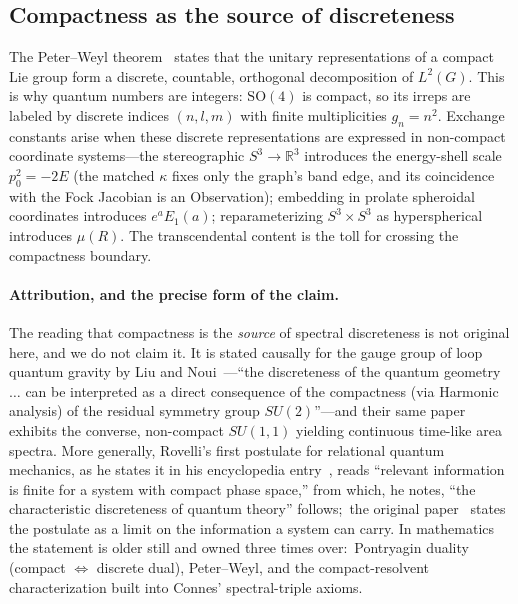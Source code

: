 \documentclass[aps,pra,twocolumn,superscriptaddress,longbibliography]{revtex4-2}
\begin{document}
\subsection{Compactness as the source of discreteness}

The Peter--Weyl theorem~\cite{peter_weyl1927} states that the unitary
representations of a compact Lie group form a discrete, countable,
orthogonal decomposition of $L^2(G)$.  This is why quantum numbers are
integers: $\mathrm{SO}(4)$ is compact, so its irreps are labeled by
discrete indices $(n, l, m)$ with finite multiplicities $g_n = n^2$.
Exchange constants arise when these discrete representations are
expressed in non-compact coordinate systems---the stereographic
$S^3 \to \mathbb{R}^3$ introduces the energy-shell scale $p_0^2 = -2E$
(the matched $\kappa$ fixes only the graph's band edge, and its
coincidence with the Fock Jacobian is an Observation); embedding in prolate
spheroidal coordinates introduces $e^a E_1(a)$; reparameterizing
$S^3 \times S^3$ as hyperspherical introduces $\mu(R)$.  The
transcendental content is the toll for crossing the compactness
boundary.

\paragraph{Attribution, and the precise form of the claim.}
The reading that compactness is the \emph{source} of spectral discreteness
is not original here, and we do not claim it.  It is stated causally for
the gauge group of loop quantum gravity by Liu and
Noui~\cite{liu_noui2017}---``the discreteness of the quantum geometry
$\ldots$ can be interpreted as a direct consequence of the compactness
(via Harmonic analysis) of the residual symmetry group $SU(2)$''---and
their same paper exhibits the converse, non-compact $SU(1,1)$ yielding
continuous time-like area spectra.  More generally, Rovelli's
first postulate for relational quantum mechanics, as he states it in his
encyclopedia entry~\cite{rovelli_sep}, reads ``relevant
information is finite for a system with compact phase space,'' from which,
he notes, ``the characteristic discreteness of quantum
theory'' follows;\ the original paper~\cite{rovelli1996} states the postulate
as a limit on the information a system can carry.  In mathematics the statement is older
still and owned three times over:\ Pontryagin duality (compact
$\Leftrightarrow$ discrete dual), Peter--Weyl, and the compact-resolvent
characterization built into Connes' spectral-triple axioms.
\end{document}
